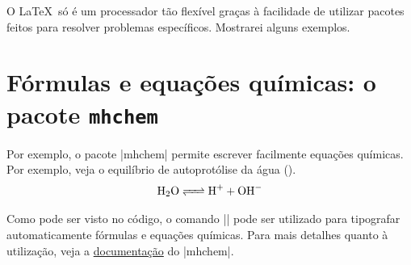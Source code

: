 \documentclass[12pt,oneside,a4paper,english,brazil]{abntex2}
\begin{document}
    O \LaTeX\ só é um processador tão flexível graças à facilidade de utilizar pacotes feitos para resolver problemas específicos. Mostrarei alguns exemplos.

    \section{Fórmulas e equações químicas: o pacote \texttt{mhchem}}
        Por exemplo, o pacote \ltx|mhchem| permite escrever facilmente equações químicas. Por exemplo, veja o equilíbrio de autoprotólise da água ().
        \[ \ce{H2O <=> H+ + OH-} \]
        
        Como pode ser visto no código, o comando \ltx|\ce{}| pode ser utilizado para tipografar automaticamente fórmulas e equações químicas. Para mais detalhes quanto à utilização, veja a \href{https://ctan.org/pkg/mhchem}{documentação} do \ltx|mhchem|.
        
\end{document}
